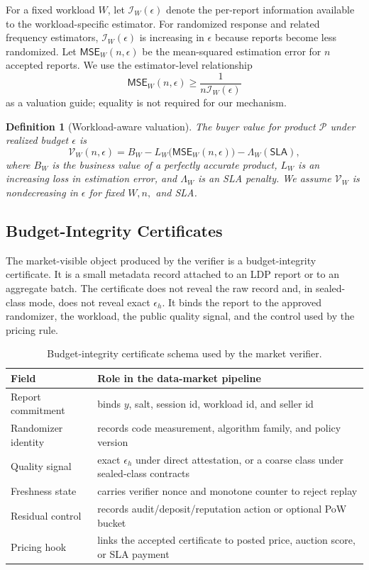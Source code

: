 \documentclass[conference]{IEEEtran}
\newtheorem{definition}{Definition}[section]
\newcommand{\eps}{\epsilon}
\newcommand{\V}{\mathscr{V}}
\newcommand{\MSE}{\mathsf{MSE}}
\begin{document}
For a fixed workload $W$, let $\mathcal{I}_W(\eps)$ denote the per-report information available to the workload-specific estimator. For randomized response and related frequency estimators, $\mathcal{I}_W(\eps)$ is increasing in $\eps$ because reports become less randomized. Let $\MSE_W(n,\eps)$ be the mean-squared estimation error for $n$ accepted reports. We use the estimator-level relationship
\[
\MSE_W(n,\eps)\ge \frac{1}{n\mathcal{I}_W(\eps)}
\]
as a valuation guide; equality is not required for our mechanism.

\begin{definition}[Workload-aware valuation]
\label{def:valuation}
The buyer value for product $\mathcal{P}$ under realized budget $\eps$ is
\[
\V_W(n,\eps)=B_W-L_W\big(\MSE_W(n,\eps)\big)-\Lambda_W(\mathsf{SLA}),
\]
where $B_W$ is the business value of a perfectly accurate product, $L_W$ is an increasing loss in estimation error, and $\Lambda_W$ is an SLA penalty. We assume $\V_W$ is nondecreasing in $\eps$ for fixed $W,n,$ and SLA.
\end{definition}


\subsection{Budget-Integrity Certificates}
\label{subsec:certificate}

The market-visible object produced by the verifier is a budget-integrity certificate. It is a small metadata record attached to an LDP report or to an aggregate batch. The certificate does not reveal the raw record and, in sealed-class mode, does not reveal exact $\eps_h$. It binds the report to the approved randomizer, the workload, the public quality signal, and the control used by the pricing rule.

\begin{table}[t]
\caption{Budget-integrity certificate schema used by the market verifier.}
\label{tab:cert-schema}
\centering
\scriptsize
\begin{tabularx}{\columnwidth}{p{}X}
\toprule
Field & Role in the data-market pipeline \\
\midrule
Report commitment & binds $y$, salt, session id, workload id, and seller id \\
Randomizer identity & records code measurement, algorithm family, and policy version \\
Quality signal & exact $\eps_h$ under direct attestation, or a coarse class under sealed-class contracts \\
Freshness state & carries verifier nonce and monotone counter to reject replay \\
Residual control & records audit/deposit/reputation action or optional PoW bucket \\
Pricing hook & links the accepted certificate to posted price, auction score, or SLA payment \\
\bottomrule
\end{tabularx}
\end{table}
\end{document}
